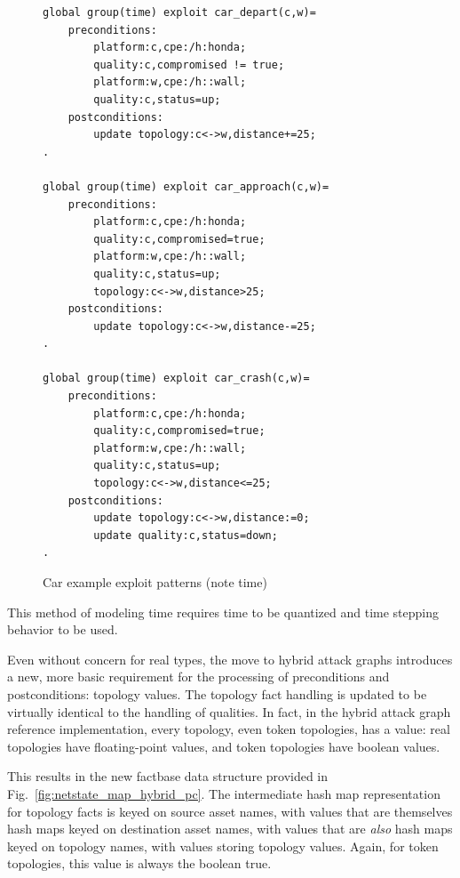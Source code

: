 \begin{figure}
\begin{lstlisting}
global group(time) exploit car_depart(c,w)=
    preconditions:
        platform:c,cpe:/h:honda;
        quality:c,compromised != true;
        platform:w,cpe:/h::wall;
        quality:c,status=up;
    postconditions:
        update topology:c<->w,distance+=25;
.

global group(time) exploit car_approach(c,w)=
    preconditions:
        platform:c,cpe:/h:honda;
        quality:c,compromised=true;
        platform:w,cpe:/h::wall;
        quality:c,status=up;
        topology:c<->w,distance>25;
    postconditions:
        update topology:c<->w,distance-=25;
.

global group(time) exploit car_crash(c,w)=
    preconditions:
        platform:c,cpe:/h:honda;
        quality:c,compromised=true;
        platform:w,cpe:/h::wall;
        quality:c,status=up;
        topology:c<->w,distance<=25;
    postconditions:
        update topology:c<->w,distance:=0;
        update quality:c,status=down;
.
\end{lstlisting}
\caption{Car example exploit patterns (note time)}
\label{fig:illustrative_time_xp}
\end{figure}

This method of modeling time requires time to be quantized and time stepping
behavior to be used. 

Even without concern for real types, the move to hybrid attack graphs 
introduces a new, more basic requirement for the processing of preconditions
and postconditions: topology values. The topology fact handling is updated
to be virtually identical to the handling of qualities. In fact, in the hybrid 
attack graph
reference implementation, every topology, even token topologies, has a value:
real topologies have floating-point values, and token topologies have boolean
values.

This results in the new factbase data structure provided in 
Fig.~\ref{fig:netstate_map_hybrid_pc}. The intermediate hash map representation
for topology facts is keyed on source asset names, with values that are
themselves hash maps keyed on destination asset names, with values that are
\emph{also} hash maps keyed on topology names, with values storing topology
values. Again, for token topologies, this value is always the boolean true.

